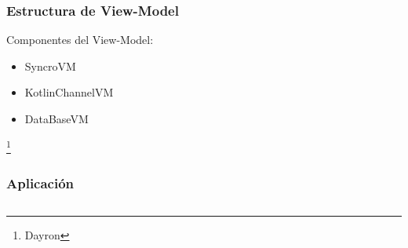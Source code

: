 \documentclass[14pt]{beamer}
\begin{document}
\begin{frame}
\frametitle{Estructura de View-Model}
Componentes del View-Model:
\begin{itemize}
\item SyncroVM
\item KotlinChannelVM
\item DataBaseVM


\end{itemize}

\footnote{Dayron}
\end{frame}


\begin{frame}
\frametitle{Aplicación}

\begin{columns}
\begin{column}{0.25\textwidth}
\begin{center}


\end{center}
\end{column}
\end{columns}
\end{frame}
\end{document}
